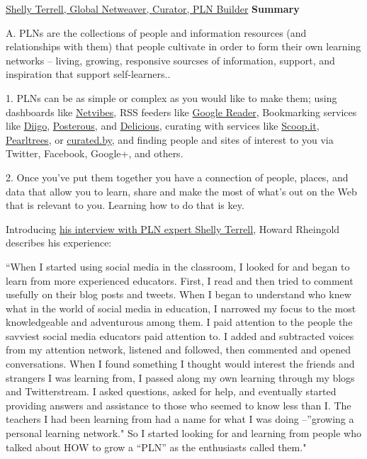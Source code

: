 \href{http://player.vimeo.com/video/15880455}{Shelly Terrell, Global
Netweaver, Curator, PLN Builder} \textbf{} \textbf{Summary}

A. PLNs are the collections of people and information resources (and
relationships with them) that people cultivate in order to form their
own learning networks -- living, growing, responsive sourcses of
information, support, and inspiration that support self-learners..

1. PLNs can be as simple or complex as you would like to make them;
using dashboards like \href{http://www.netvibes.com/en}{Netvibes}, RSS
feeders like \href{http://www.google.com/reader}{Google Reader},
Bookmarking services like \href{http://www.diigo.com/}{Diigo},
\href{https://posterous.com/}{Posterous}, and
\href{http://delicious.com/}{Delicious}, curating with services like
\href{http://www.scoop.it/}{Scoop.it},
\href{http://www.pearltrees.com/}{Pearltrees}, or
\href{http://www.curated.by/}{curated.by}, and finding people and sites
of interest to you via Twitter, Facebook, Google+, and others.

2. Once you've put them together you have a connection of people,
places, and data that allow you to learn, share and make the most of
what's out on the Web that is relevant to you. Learning how to do that
is key.

Introducing
\href{http://dmlcentral.net/blog/howard-rheingold/shelly-terrell-global-netweaver-curator-pln-builder}{his
interview with PLN expert Shelly Terrell}, Howard Rheingold describes
his experience:

``When I started using social media in the classroom, I looked for and
began to learn from more experienced educators. First, I read and then
tried to comment usefully on their blog posts and tweets. When I began
to understand who knew what in the world of social media in education, I
narrowed my focus to the most knowledgeable and adventurous among them.
I paid attention to the people the savviest social media educators paid
attention to. I added and subtracted voices from my attention network,
listened and followed, then commented and opened conversations. When I
found something I thought would interest the friends and strangers I was
learning from, I passed along my own learning through my blogs and
Twitterstream. I asked questions, asked for help, and eventually started
providing answers and assistance to those who seemed to know less than
I. The teachers I had been learning from had a name for what I was doing
--''growing a personal learning network." So I started looking for and
learning from people who talked about HOW to grow a ``PLN'' as the
enthusiasts called them."

